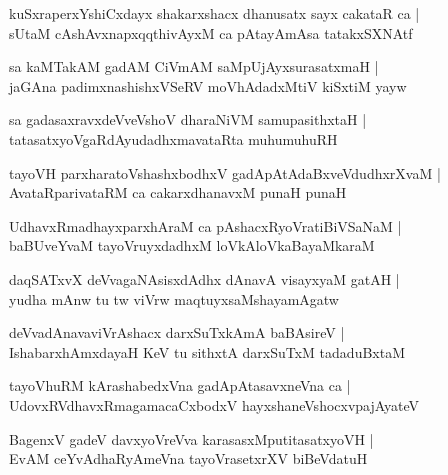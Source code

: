 \documentclass[twoside,12pt,openright]{book}
\newcounter{shloka}[chapter]
\begin{document}
\begin{shloka}%
kuSxraperxYshiCxdayx shakarxshacx dhanusatx sayx cakataR ca |\\
sUtaM cAshAvxnapxqqthivAyxM ca pAtayAmAsa tatakxSXNAtf
\end{shloka}

\begin{shloka}%
sa kaMTakAM gadAM CiVmAM saMpUjAyxsurasatxmaH |\\
jaGAna padimxnashishxVSeRV moVhAdadxMtiV kiSxtiM yayw 
\end{shloka}

\begin{shloka}%
sa gadasaxravxdeVveVshoV dharaNiVM samupasithxtaH |\\
tatasatxyoVgaRdAyudadhxmavataRta muhumuhuRH 
\end{shloka}

\begin{shloka}%
tayoVH parxharatoVshashxbodhxV gadApAtAdaBxveVdudhxrXvaM |\\
AvataRparivataRM ca cakarxdhanavxM punaH punaH 
\end{shloka}

\begin{shloka}%
UdhavxRmadhayxparxhAraM ca pAshacxRyoVratiBiVSaNaM |\\
baBUveYvaM tayoVruyxdadhxM loVkAloVkaBayaMkaraM 
\end{shloka}

\begin{shloka}%
daqSATxvX deVvagaNAsisxdAdhx dAnavA visayxyaM gatAH |\\
yudha mAnw tu tw viVrw maqtuyxsaMshayamAgatw	
\end{shloka}

\begin{shloka}%
deVvadAnavaviVrAshacx darxSuTxkAmA baBAsireV |\\
IshabarxhAmxdayaH KeV tu sithxtA darxSuTxM tadaduBxtaM 
\end{shloka}

\begin{shloka}%
tayoVhuRM kArashabedxVna gadApAtasavxneVna ca |\\
UdovxRVdhavxRmagamacaCxbodxV hayxshaneVshocxvpajAyateV 
\end{shloka}

\begin{shloka}%
BagenxV gadeV davxyoVreVva karasasxMputitasatxyoVH |\\
EvAM ceYvAdhaRyAmeVna tayoVrasetxrXV biBeVdatuH 
\end{shloka}
\end{document}
